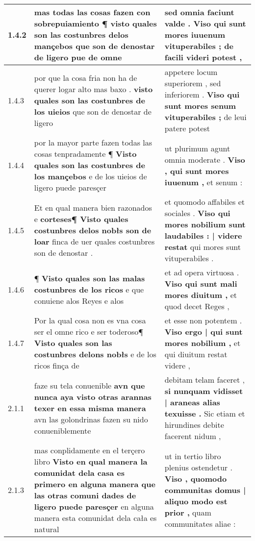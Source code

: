 \begin{tabular}{|p{1cm}|p{6.5cm}|p{6.5cm}|}
1.4.2 & mas todas las cosas fazen con sobrepuiamiento ¶ \textbf{ visto quales son las costunbres delos mançebos } que son de denostar de ligero pue de omne & sed omnia faciunt valde . \textbf{ Viso qui sunt mores iuuenum vituperabiles ; } de facili videri potest , \\\hline
1.4.3 & por que la cosa fria non ha de querer logar alto mas baxo . \textbf{ visto quales son las costunbres de los uieios } que son de denostar de ligero & appetere locum superiorem , sed inferiorem . \textbf{ Viso qui sunt mores senum vituperabiles ; } de leui patere potest \\\hline
1.4.4 & por la mayor parte fazen todas las cosas tenpradamente ¶ \textbf{ Visto quales son las costunbres de los mançebos } e de los uieios de ligero puede paresçer & ut plurimum agunt omnia moderate . \textbf{ Viso , qui sunt mores iuuenum , } et senum : \\\hline
1.4.5 & Et en qual manera bien razonados e \textbf{ corteses¶ Visto quales costunbres delos nobłs son de loar } finca de uer quales costunbres son de denostar . & et quomodo affabiles et sociales . \textbf{ Viso qui mores nobilium sunt laudabiles : | videre restat } qui mores sunt vituperabiles . \\\hline
1.4.6 & ¶ \textbf{ Visto quales son las malas costunbres de los ricos } e que conuiene alos Reyes e alos & et ad opera virtuosa . \textbf{ Viso qui sunt mali mores diuitum , } et quod decet Reges , \\\hline
1.4.7 & Por la qual cosa non es vna cosa ser el omne rico e ser toderoso¶ \textbf{ Visto quales son las costunbres delons nobłs } e de los ricos finça de & et esse non potentem . \textbf{ Viso ergo | qui sunt mores nobilium , } et qui diuitum restat videre , \\\hline
2.1.1 & faze su tela conuenible \textbf{ avn que nunca aya visto otras arannas texer en essa misma manera } avn las golondrinas fazen su nido conueniblemente & debitam telam faceret , \textbf{ si nunquam vidisset | araneas alias texuisse . } Sic etiam et hirundines debite facerent nidum , \\\hline
2.1.3 & mas conplidamente en el terçero libro \textbf{ Visto en qual manera la comunidat dela casa es primero en alguna manera que las otras comuni dades de ligero puede paresçer } en alguna manera esta comunidat dela cała es natural & ut in tertio libro plenius ostendetur . \textbf{ Viso , quomodo communitas domus | aliquo modo est prior , } quam communitates aliae : \\\hline

\end{tabular}
